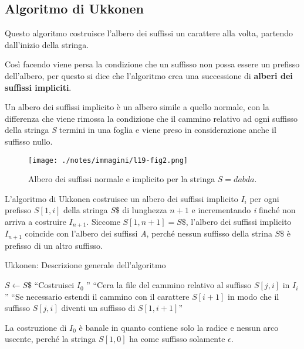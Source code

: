 \subsection{Algoritmo di Ukkonen}\label{algoritmo-di-ukkonen}

Questo algoritmo costruisce l'albero dei suffissi un carattere alla volta, partendo dall'inizio della stringa.

Così facendo viene persa la condizione che un suffisso non possa essere un prefisso dell'albero, per questo si dice che l'algoritmo crea una successione di \textbf{alberi dei suffissi impliciti}.

Un albero dei suffissi implicito è un albero simile a quello normale, con la differenza che viene rimossa la condizione che il cammino relativo ad ogni suffisso della stringa \textit{S} termini in una foglia e viene preso in considerazione anche il suffisso nullo.

\begin{figure}[htbp]
	\centering
	\texttt{[image: ./notes/immagini/l19-fig2.png]}
	\caption{Albero dei suffissi normale e implicito per la stringa $ S = dabda $.}
\end{figure}

L'algoritmo di Ukkonen costruisce un albero dei suffissi implicito $ I_i $ per ogni prefisso $ S[1,i] $ della stringa $ S\$ $ di lunghezza $ n+1 $ e incrementando \textit{i} finché non arriva a costruire $ I_{n+1} $. Siccome $ S[1,n+1] = S\$ $, l'albero dei suffissi implicito $ I_{n+1} $ coincide con l'albero dei suffissi \textit{A}, perché nessun suffisso della strina $ S\$ $ è prefisso di un altro suffisso.

\begin{breakablealgorithm}
	\caption{Ukkonen: Descrizione generale dell'algoritmo }
	\begin{algorithmic}[1]
			\State $ S \gets S\$ $ 
			\State ``Costruisci $ I_0 $ ''
					\State ``Cera la file del cammino relativo al suffisso $ S[j,i] $ in $ I_i $''
					\State ``Se necessario estendi il cammino con il carattere $S[i+1] $ in modo che il suffisso $ S[j,i] $ diventi un suffisso di $ S[1,i+1] $''
				\EndFor
			\EndFor
		\EndFunction
	\end{algorithmic}
\end{breakablealgorithm}

La costruzione di $ I_0 $ è banale in quanto contiene solo la radice e nessun arco uscente, perché la stringa $ S[1,0] $ ha come suffisso solamente $ \epsilon $.

